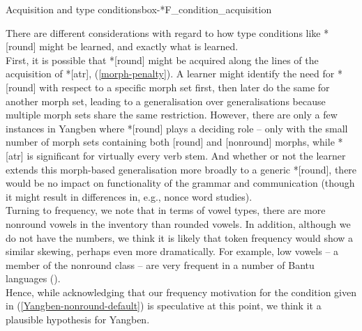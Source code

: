 \begin{dadpbox}{Acquisition and type conditions}{box-*F_condition_acquisition}



There are different considerations with regard to how type conditions like *[round] might be learned, and exactly what is learned.\\

First,  it is possible that *[round] might be acquired along the lines of the acquisition of *[atr],  (\ref{morph-penalty}). A learner might identify the need for *[round] with respect to a specific morph set first, then later do the same for another morph set, leading to a generalisation over generalisations because multiple morph sets share the same restriction. However, there are only a few instances in Yangben where *[round] plays a deciding role -- only with the small number of morph sets containing both [round] and [nonround] morphs, while *[atr] is significant for virtually every verb stem.  And whether or not the learner extends this morph-based generalisation more broadly to a generic *[round], there would be no impact on functionality of the grammar and communication (though it might result in differences in, e.g., nonce word studies). \\ 

Turning  to frequency, we note that in terms of vowel types, there are more nonround vowels in the inventory than rounded vowels. In addition, although we do not have the numbers, we think it is likely that token frequency would show a similar skewing, perhaps even more dramatically. For example, low vowels -- a member of the nonround class -- are very frequent in a number of Bantu languages (\citealt{Archangeli+:2012Smith}).\\

Hence, while acknowledging that our frequency motivation for the condition given in (\ref{Yangben-nonround-default}) is speculative at this point, we think  it  a plausible hypothesis for Yangben.
\end{dadpbox}

